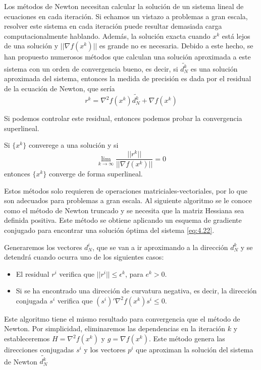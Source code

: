 Los métodos de Newton necesitan calcular la solución de un sistema lineal de ecuaciones en cada iteración. 
Si echamos un vistazo a problemas a gran escala, resolver este sistema en cada iteración puede resultar demasiada carga computacionalmente hablando. 
Además, la solución exacta cuando $x^k$ está lejos de una solución y $||\nabla f(x^k)||$ es grande no es necesaria. 
Debido a este hecho, se han propuesto numerosos métodos que calculan una solución aproximada a este sistema con un orden de convergencia bueno, es decir, si $\widetilde{d^k_N}$ es una solución aproximada del sistema, entonces la medida de precisión es dada por el residual de la ecuación de Newton, que sería 
\begin{equation*}
r^k = \nabla^2 f(x^k)\widetilde{d^k_N} + \nabla f(x^k)
\end{equation*}

Si podemos controlar este residual, entonces podemos probar la convergencia superlineal.

\begin{proposicion}
Si $\{x^k\}$ converege a una solución y si 
\begin{equation*}
\lim_{k\xrightarrow{}{}\infty} \dfrac{||r^k||}{||\nabla f(x^k)||} = 0
\end{equation*}
entonces $\{x^k\}$ converge de forma superlineal.
\end{proposicion}

Estos métodos solo requieren de operaciones matriciales-vectoriales, por lo que son adecuados para problemas a gran escala. 
Al siguiente algoritmo se le conoce como el método de Newton truncado y se necesita que la matriz Hessiana sea definida positiva. 
Este método se obtiene aplicando un esquema de gradiente conjugado para encontrar una solución óptima del sistema \ref{eq:4.22}.

Generaremos los vectores $d_N^i$, que se van a ir aproximando a la dirección $d_N^k$ y se detendrá cuando ocurra uno de los siguientes casos:
\begin{itemize}
	\item El residual $r^i$ verifica que $||r^i|| \leq \epsilon^k$, para $e^k > 0$.
	\item Si se ha encontrado una dirección de curvatura negativa, es decir, la dirección conjugada $s^i$ verifica que $(s^i)'\nabla^2f(x^k)s^i\leq 0$.
\end{itemize}

Este algoritmo tiene el mismo resultado para convergencia que el método de Newton. 
Por simplicidad, eliminaremos las dependencias en la iteración $k$ y estableceremos $H = \nabla^2 f(x^k)$ y $g=\nabla f(x^k)$. 
Este método genera las direcciones conjugadas $s^i$ y los vectores $p^i$ que aproximan la solución del sistema de Newton $\widetilde{d^k_N}$

